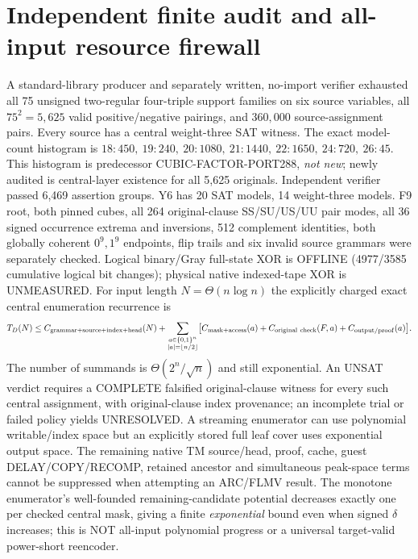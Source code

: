 \documentclass[11pt]{article}
\begin{document}
\section{Independent finite audit and all-input resource firewall}
A standard-library producer and separately written, no-import verifier exhausted all 75 unsigned two-regular four-triple support families on six source variables, all $75^2=5,625$ valid positive/negative pairings, and $360,000$ source-assignment pairs. Every source has a central weight-three SAT witness. The exact model-count histogram is $18:450,\ 19:240,\ 20:1080,\ 21:1440,\ 22:1650,\ 24:720,\ 26:45$. This histogram is predecessor CUBIC-FACTOR-PORT288, \emph{not new}; newly audited is central-layer existence for all 5,625 originals. Independent verifier passed 6,469 assertion groups.
Y6 has 20 SAT models, 14 weight-three models. F9 root, both pinned cubes, all 264 original-clause SS/SU/US/UU pair modes, all 36 signed occurrence extrema and inversions, 512 complement identities, both globally coherent $0^9,1^9$ endpoints, flip trails and six invalid source grammars were separately checked. Logical binary/Gray full-state XOR is OFFLINE (4977/3585 cumulative logical bit changes); physical native indexed-tape XOR is UNMEASURED.
For input length $N=\Theta(n\log n)$ the explicitly charged exact central enumeration recurrence is
\[
T_D(N)\le C_{\rm grammar+source+index+head}(N)+
 \sum_{\substack{a\in\{0,1\}^n\\|a|=\lfloor n/2\rfloor}}
 \bigl[C_{\rm mask+access}(a)+C_{\rm original\ check}(F,a)+C_{\rm output/proof}(a)\bigr].
\]
The number of summands is $\Theta(2^n/\sqrt n)$ and still exponential. An UNSAT verdict requires a COMPLETE falsified original-clause witness for every such central assignment, with original-clause index provenance; an incomplete trial or failed policy yields UNRESOLVED. A streaming enumerator can use polynomial writable/index space but an explicitly stored full leaf cover uses exponential output space. The remaining native TM source/head, proof, cache, guest DELAY/COPY/RECOMP, retained ancestor and simultaneous peak-space terms cannot be suppressed when attempting an ARC/FLMV result. The monotone enumerator's well-founded remaining-candidate potential decreases exactly one per checked central mask, giving a finite \emph{exponential} bound even when signed $\delta$ increases; this is NOT all-input polynomial progress or a universal target-valid power-short reencoder.
\end{document}
